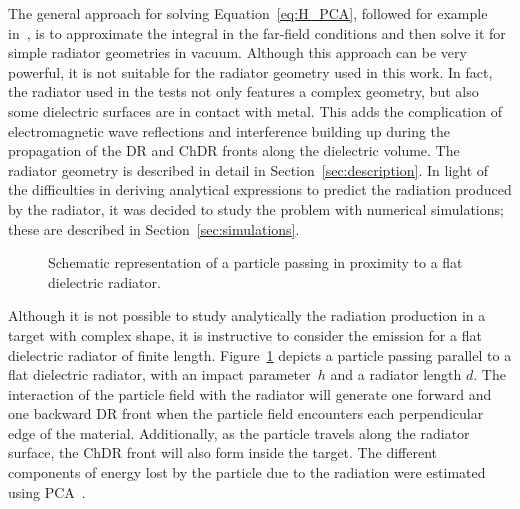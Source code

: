 The general approach for solving Equation~\ref{eq:H_PCA}, followed for example in~\cite{PhysRevAccelBeams.23.022802}, is to approximate the integral in the far-field conditions and then solve it for simple radiator geometries in vacuum. Although this approach can be very powerful, it is not suitable for the radiator geometry used in this work. In fact, the radiator used in the tests not only features a complex geometry, but also some dielectric surfaces are in contact with metal. This adds the complication of electromagnetic wave reflections and interference building up during the propagation of the DR and ChDR fronts along the dielectric volume. The radiator geometry is described in detail in Section~\ref{sec:description}. In light of the difficulties in deriving analytical expressions to predict the radiation produced by the radiator, it was decided to study the problem with numerical simulations; these are described in Section~\ref{sec:simulations}.


\begin{figure}[!b]
\centering

\caption{Schematic representation of a particle passing in proximity to a flat dielectric radiator.}
\label{fig:PCA_flat_radaitor}
\end{figure}


Although it is not possible to study analytically the radiation production in a target with complex shape, it is instructive to consider the emission for a flat dielectric radiator of finite length. Figure~\ref{fig:PCA_flat_radaitor} depicts a particle passing parallel to a flat dielectric radiator, with an impact parameter~$h$ and a radiator length $d$. The interaction of the particle field with the radiator will generate one forward and one backward DR front when the particle field encounters each perpendicular edge of the material. Additionally, as the particle travels along the radiator surface, the ChDR front will also form inside the target. The different components of energy lost by the particle due to the radiation were estimated using PCA~\cite{Shevelev:2014doa}.


